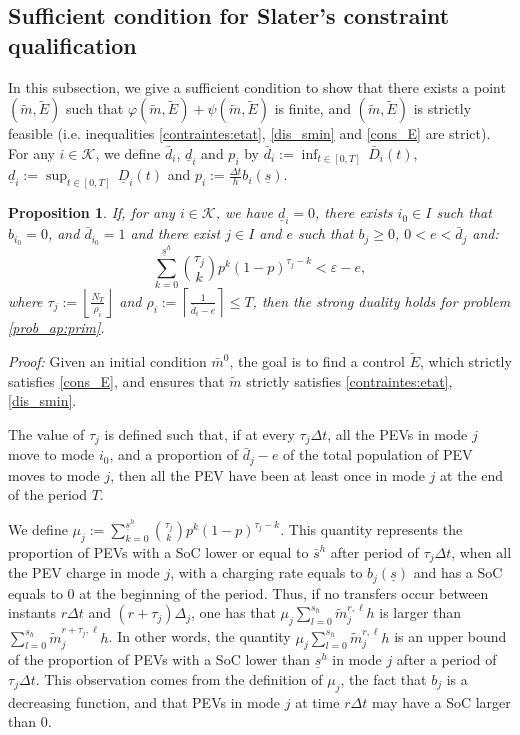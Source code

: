 \documentclass[conference]{IEEEtran}
\newtheorem{proposition}{Proposition}[section]
\begin{document}
\subsection{Sufficient condition for Slater’s constraint qualification}\label{slater_suff_cond}

In this subsection, we  give a sufficient condition to show that there exists a point $(\tilde{m},\tilde{E})$ such that $\varphi(\tilde{m},\tilde{E})+ \psi(\tilde{m},\tilde{E})$ is finite, and $(\tilde{m},\tilde{E})$ is strictly feasible (i.e. inequalities \eqref{contraintes:etat}, \eqref{dis_smin} and \eqref{cons_E} are strict).
For any $i\in \mathcal{K}$, we define $\bar{d}_i$, $\underline{d}_i$ and $p_i$  by $\bar{d}_i:=\inf_{t\in [0,T]}\,\bar{D}_i(t)$, $\underline{d}_i:=\sup_{t\in [0,T]}\,\underline{D}_i(t)$ and $p_i:=\frac{\Delta t}{h}b_i(\underline{s})$.
\begin{proposition}
If, for any $i\in \mathcal{K}$, we have $\underline{d}_i=0$, there exists $i_0\in I$ such that $b_{i_0} =0$, and $\bar{d}_{i_0} = 1$ and there exist $j\in I$ and $e$ such that $b_j\geq 0$, $0<e<\bar{d}_j$ and:
\begin{equation}\label{binomial_constraint}
\sum_{k = 0}^{\underline{s}^h} {\tau_j\choose k}
p^k(1-p)^{ \tau_j  -k}< \varepsilon-e,
\end{equation}
where $\textstyle \tau_j:=
\left \lfloor \frac{N_T}{\rho_i}\right \rfloor$ and $\textstyle \rho_i:=\left\lceil \frac{1}{\bar{d}_i-e}\right\rceil\leq T$,
then the strong duality holds for problem \eqref{prob_ap:prim}.
\end{proposition}
\textit{Proof:} Given an initial condition $\bar{m}^0$, the goal is to find a control $\tilde{E}$, which strictly satisfies \eqref{cons_E}, and ensures that $\tilde{m}$ strictly satisfies \eqref{contraintes:etat}, \eqref{dis_smin}. 

The value of $\tau_j$ is defined such that, if at every $\tau_j\Delta t$, all the PEVs in mode $j$ move to mode ${i_0}$, and a proportion of $\bar{d}_j-e$ of the total population of PEV  moves to mode $j$, then all the PEV have been at least once in mode $j$ at the end of the period $T$. 

We define $\textstyle \mu_j:=\sum_{k = 0}^{\underline{s}^h} {\tau_j\choose k}
p^k(1-p)^{ \tau_j  -k}$. This quantity represents the proportion of PEVs with a SoC lower or equal to $\bar{s}^h$ after period of $\tau_j \Delta t$, when all the PEV charge in mode $j$, with a charging rate equals to  $b_j(\underline{s})$ and has a SoC equals to $0$ at the beginning of the period.
Thus, if no transfers occur between instants $r\Delta t$ and $(r+\tau_j)\Delta_j$,  one has that $\textstyle \mu_j \sum_{l = 0}^{s_h}\tilde{m}_j^{r,\ell}h$ is larger than $\textstyle \sum_{l = 0}^{s_h}\tilde{m}_j^{r+\tau_j,\ell}h$.  In other words, the quantity $\textstyle \mu_j \sum_{l = 0}^{s_h}\tilde{m}_j^{r,\ell}h$ is an upper bound of the proportion of PEVs with a SoC lower than $\underline{s}^h$ in mode $j$ after a period of $\tau_j\Delta t$. This observation comes from the definition of $\mu_j$, the fact that $b_j$ is a decreasing function, and that PEVs in mode $j$ at time $r\Delta t$ may have a SoC larger than $0$.
\end{document}
